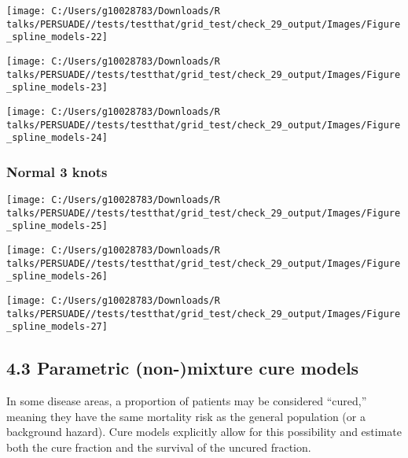 \documentclass[
]{article}
\begin{document}
\begin{flushleft}\texttt{[image: C:/Users/g10028783/Downloads/R talks/PERSUADE//tests/testthat/grid\_test/check\_29\_output/Images/Figure\_spline\_models-22]} \end{flushleft}

\begin{flushleft}\texttt{[image: C:/Users/g10028783/Downloads/R talks/PERSUADE//tests/testthat/grid\_test/check\_29\_output/Images/Figure\_spline\_models-23]} \end{flushleft}

\begin{flushleft}\texttt{[image: C:/Users/g10028783/Downloads/R talks/PERSUADE//tests/testthat/grid\_test/check\_29\_output/Images/Figure\_spline\_models-24]} \end{flushleft}

\clearpage

\subsubsection{Normal 3 knots}\label{normal-3-knots}

\begin{flushleft}\texttt{[image: C:/Users/g10028783/Downloads/R talks/PERSUADE//tests/testthat/grid\_test/check\_29\_output/Images/Figure\_spline\_models-25]} \end{flushleft}

\begin{flushleft}\texttt{[image: C:/Users/g10028783/Downloads/R talks/PERSUADE//tests/testthat/grid\_test/check\_29\_output/Images/Figure\_spline\_models-26]} \end{flushleft}

\begin{flushleft}\texttt{[image: C:/Users/g10028783/Downloads/R talks/PERSUADE//tests/testthat/grid\_test/check\_29\_output/Images/Figure\_spline\_models-27]} \end{flushleft}

\clearpage

\subsection{4.3 Parametric (non-)mixture cure
models}\label{parametric-non-mixture-cure-models}

In some disease areas, a proportion of patients may be considered
``cured,'' meaning they have the same mortality risk as the general
population (or a background hazard). Cure models explicitly allow for
this possibility and estimate both the cure fraction and the survival of
the uncured fraction.
\end{document}
